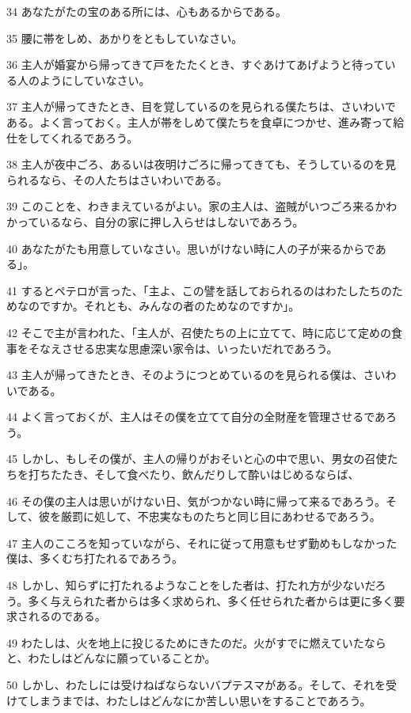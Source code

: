 \par 34 あなたがたの宝のある所には、心もあるからである。
\par 35 腰に帯をしめ、あかりをともしていなさい。
\par 36 主人が婚宴から帰ってきて戸をたたくとき、すぐあけてあげようと待っている人のようにしていなさい。
\par 37 主人が帰ってきたとき、目を覚しているのを見られる僕たちは、さいわいである。よく言っておく。主人が帯をしめて僕たちを食卓につかせ、進み寄って給仕をしてくれるであろう。
\par 38 主人が夜中ごろ、あるいは夜明けごろに帰ってきても、そうしているのを見られるなら、その人たちはさいわいである。
\par 39 このことを、わきまえているがよい。家の主人は、盗賊がいつごろ来るかわかっているなら、自分の家に押し入らせはしないであろう。
\par 40 あなたがたも用意していなさい。思いがけない時に人の子が来るからである」。
\par 41 するとペテロが言った、「主よ、この譬を話しておられるのはわたしたちのためなのですか。それとも、みんなの者のためなのですか」。
\par 42 そこで主が言われた、「主人が、召使たちの上に立てて、時に応じて定めの食事をそなえさせる忠実な思慮深い家令は、いったいだれであろう。
\par 43 主人が帰ってきたとき、そのようにつとめているのを見られる僕は、さいわいである。
\par 44 よく言っておくが、主人はその僕を立てて自分の全財産を管理させるであろう。
\par 45 しかし、もしその僕が、主人の帰りがおそいと心の中で思い、男女の召使たちを打ちたたき、そして食べたり、飲んだりして酔いはじめるならば、
\par 46 その僕の主人は思いがけない日、気がつかない時に帰って来るであろう。そして、彼を厳罰に処して、不忠実なものたちと同じ目にあわせるであろう。
\par 47 主人のこころを知っていながら、それに従って用意もせず勤めもしなかった僕は、多くむち打たれるであろう。
\par 48 しかし、知らずに打たれるようなことをした者は、打たれ方が少ないだろう。多く与えられた者からは多く求められ、多く任せられた者からは更に多く要求されるのである。
\par 49 わたしは、火を地上に投じるためにきたのだ。火がすでに燃えていたならと、わたしはどんなに願っていることか。
\par 50 しかし、わたしには受けねばならないバプテスマがある。そして、それを受けてしまうまでは、わたしはどんなにか苦しい思いをすることであろう。
